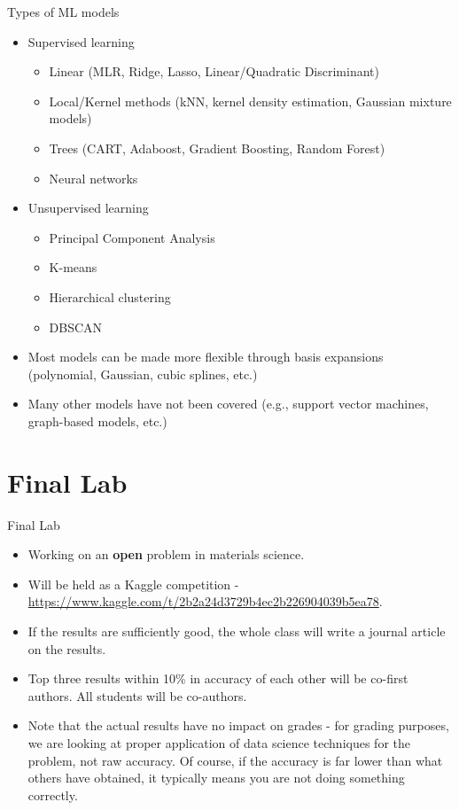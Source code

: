 \documentclass[aspectratio=169]{beamer}
\begin{document}
\begin{frame}{Types of ML models}
    \begin{itemize}
        \item Supervised learning
        \begin{itemize}
            \item Linear (MLR, Ridge, Lasso, Linear/Quadratic Discriminant)
            \item Local/Kernel methods (kNN, kernel density estimation, Gaussian mixture models)
            \item Trees (CART, Adaboost, Gradient Boosting, Random Forest)
            \item Neural networks
        \end{itemize}
        \item Unsupervised learning
        \begin{itemize}
            \item Principal Component Analysis
            \item K-means
            \item Hierarchical clustering
            \item DBSCAN
        \end{itemize}
        \item Most models can be made more flexible through basis expansions (polynomial, Gaussian, cubic splines, etc.)
        \item Many other models have not been covered (e.g., support vector machines, graph-based models, etc.)
    \end{itemize}
\end{frame}


\section{Final Lab}

\begin{frame}{Final Lab}
    \begin{itemize}
        \item Working on an \textbf{open} problem in materials science.
        \item Will be held as a Kaggle competition - \url{https://www.kaggle.com/t/2b2a24d3729b4ec2b226904039b5ea78}.
        \item If the results are sufficiently good, the whole class will write a journal article on the results.
        \item Top three results within 10\% in accuracy of each other will be co-first authors. All students will be co-authors.
        \item Note that the actual results have no impact on grades - for grading purposes, we are looking at proper application of data science techniques for the problem, not raw accuracy. Of course, if the accuracy is far lower than what others have obtained, it typically means you are not doing something correctly.
    \end{itemize}
\end{frame}
\end{document}
